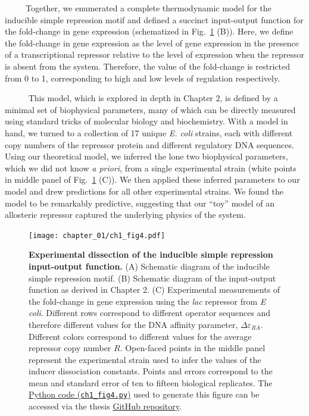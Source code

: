 \documentclass[12pt]{caltech_thesis}
\begin{document}
~~~~~Together, we enumerated a complete thermodynamic model for the
inducible simple repression motif and defined a succinct input-output
function for the fold-change in gene expression (schematized in
Fig.~\ref{fig:induction_intro} (B)). Here, we define the fold-change in
gene expression as the level of gene expression in the presence of a
transcriptional repressor relative to the level of expression when the
repressor is absent from the system. Therefore, the value of the
fold-change is restricted from 0 to 1, corresponding to high and low
levels of regulation respectively.

~~~~~ This model, which is explored in depth in Chapter 2, is defined by
a minimal set of biophysical parameters, many of which can be directly
measured using standard tricks of molecular biology and biochemistry.
With a model in hand, we turned to a collection of 17 unique \emph{E.
coli} strains, each with different copy numbers of the repressor protein
and different regulatory DNA sequences. Using our theoretical model, we
inferred the lone two biophysical parameters, which we did not know
\emph{a priori}, from a single experimental strain (white points in
middle panel of Fig.~\ref{fig:induction_intro} (C)). We then applied
these inferred parameters to our model and drew predictions for all
other experimental strains. We found the model to be remarkably
predictive, suggesting that our ``toy'' model of an allosteric repressor
captured the underlying physics of the system.

\hypertarget{fig:induction_intro}{%
\begin{figure}
\centering
\texttt{[image: chapter\_01/ch1\_fig4.pdf]}
\caption[{Experimental dissection of the inducible simple repression
input-output function.}]{\textbf{Experimental dissection of the
inducible simple repression input-output function.} (A) Schematic
diagram of the inducible simple repression motif. (B) Schematic diagram
of the input-output function as derived in Chapter 2. (C) Experimental
measurements of the fold-change in gene expression using the \emph{lac}
repressor from \emph{E coli}. Different rows correspond to different
operator sequences and therefore different values for the DNA affinity
parameter, \(\Delta\varepsilon_{RA}\). Different colors correspond to
different values for the average repressor copy number \(R\). Open-faced
points in the middle panel represent the experimental strain used to
infer the values of the inducer dissociation constants. Points and
errors correspond to the mean and standard error of ten to fifteen
biological replicates. The
\href{https://github.com/gchure/phd/blob/master/src/chapter_01/code/ch1_fig4.py}{Python
code (\texttt{ch1\_fig4.py})} used to generate this figure can be
accessed via the thesis \href{https://github.com/gchure/phd}{GitHub
repository}.}
\label{fig:induction_intro}
\end{figure}
}
\end{document}
